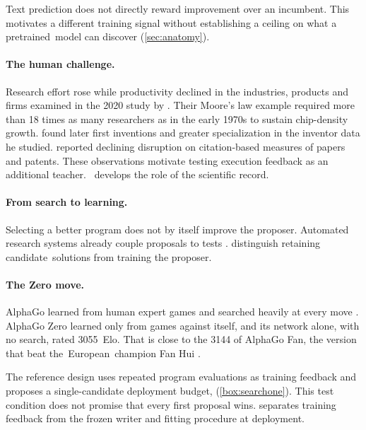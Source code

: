 Text prediction does not directly reward improvement over an incumbent.
This motivates a different training signal without establishing a ceiling
on what a \mbox{pretrained model} can discover (\cref{sec:anatomy}).

\paragraph{The human challenge.}
Research effort rose while productivity declined in the industries,
products and firms examined in the 2020 study by \citet{bloom2020ideas}.
Their Moore's law example required more than 18 times as many
researchers as in the early 1970s to sustain chip-density growth.
\citet{jones2009burden} found later first inventions and greater
specialization in the inventor data he studied.
\citet{park2023disruptive} reported declining disruption on citation-based
measures of papers and patents. These observations motivate testing execution feedback as an additional
teacher.
\mbox{ develops} the role of the scientific record.

\paragraph{From search to learning.}
Selecting a better program does not by itself improve the proposer.
Automated research systems already couple proposals to tests
\citep{lu2024aiscientist,gottweis2025coscientist,novikov2025alphaevolve,karpathy2026autoresearch,socher2026bookbite,socher2026eureka}.
 distinguish retaining \mbox{candidate solutions} from
training the proposer.

\paragraph{The Zero move.}
AlphaGo learned from human expert games and searched heavily at every move
\citep{silver2016mastering}.
AlphaGo Zero learned only from games against itself, and its network alone,
with no search, rated \num{3055}~Elo. That is close to the \num{3144} of AlphaGo Fan, the
version that beat \mbox{the European champion} Fan Hui
\citep{silver2016mastering,silver2017mastering}.

The reference design uses repeated program evaluations as training feedback
and proposes a single-candidate deployment budget, \searchone{} (\cref{box:searchone}).
This test condition does not promise that every first proposal wins.
 separates training feedback from the frozen writer
and fitting procedure at deployment.

